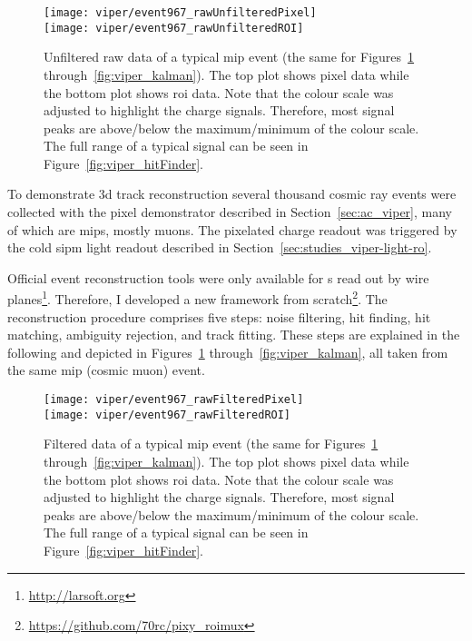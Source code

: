 
\begin{figure}[tbp]
	\centering
	\texttt{[image: viper/event967\_rawUnfilteredPixel]}\\
	\texttt{[image: viper/event967\_rawUnfilteredROI]}
	\caption[Unfiltered raw data of typical pixel demonstrator event]{%
		Unfiltered raw data of a typical \acrshort{mip} event (the same for Figures~\ref{fig:viper_unfilteredRawData} through~\ref{fig:viper_kalman}).
		The top plot shows pixel data while the bottom plot shows \acrshort{roi} data.
		Note that the colour scale was adjusted to highlight the charge signals.
		Therefore, most signal peaks are above/below the maximum/minimum of the colour scale.
		The full range of a typical signal can be seen in Figure~\ref{fig:viper_hitFinder}.
	}
	\label{fig:viper_unfilteredRawData}
\end{figure}

To demonstrate \gls{3d} track reconstruction several thousand cosmic ray events were collected with the \AC{} pixel demonstrator described in Section~\ref{sec:ac_viper}, many of which are \glspl{mip}, mostly muons.
The pixelated charge readout was triggered by the cold \gls{sipm} light readout described in Section~\ref{sec:studies_viper-light-ro}.

Official event reconstruction tools were only available for \lartpc{}s read out by wire planes\footnote{\url{http://larsoft.org}}.
Therefore, I developed a new framework from scratch\footnote{\url{https://github.com/70rc/pixy_roimux}}.
The reconstruction procedure comprises five steps: noise filtering, hit finding, hit matching, ambiguity rejection, and track fitting.
These steps are explained in the following and depicted in Figures~\ref{fig:viper_unfilteredRawData} through~\ref{fig:viper_kalman}, all taken from the same \gls{mip} (cosmic muon) event.

\begin{figure}[tbp]
	\centering
	\texttt{[image: viper/event967\_rawFilteredPixel]}\\
	\texttt{[image: viper/event967\_rawFilteredROI]}
	\caption[Filtered data of typical pixel demonstrator event]{%
		Filtered data of a typical \acrshort{mip} event (the same for Figures~\ref{fig:viper_unfilteredRawData} through~\ref{fig:viper_kalman}).
		The top plot shows pixel data while the bottom plot shows \acrshort{roi} data.
		Note that the colour scale was adjusted to highlight the charge signals.
		Therefore, most signal peaks are above/below the maximum/minimum of the colour scale.
		The full range of a typical signal can be seen in Figure~\ref{fig:viper_hitFinder}.
	}
	\label{fig:viper_filteredRawData}
\end{figure}

